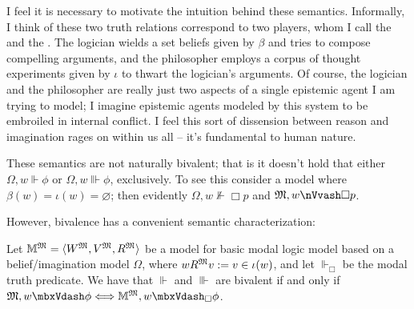 I feel it is necessary to motivate the intuition behind these semantics.  
Informally, I think of these two truth relations correspond to two players, whom I call the
{} and the {}.   The logician wields a set
beliefs given by $\beta$ and tries to compose compelling arguments, and the
philosopher employs a corpus of thought experiments given by $\iota$ to thwart
the logician's arguments.   Of course, the logician and the philosopher are
really just two aspects of a single epistemic agent I am trying to model; I
imagine epistemic agents modeled by this system to be embroiled in internal
conflict. I feel this sort of dissension between reason and imagination rages
on within us all -- it's fundamental to human nature.

These semantics are not naturally bivalent; that is it doesn't hold that
either $\Omega, w \Vdash \phi$ or $\Omega, w \Vvdash \phi$, exclusively. To
see this consider a model where $\beta (w) = \iota (w) = \varnothing$; then
evidently $\Omega, w {\nVdash} \Box p$ and $\Omega, w {\nVvdash} \Box p$.

However, bivalence has a convenient semantic characterization:

\begin{proposition}
  \label{biv1}Let $\mathbbm{M}^{\Omega} = \langle W^{\Omega}, V^{\Omega},
  R^{\Omega} \rangle$ be a model for basic modal logic model based on a
  belief/imagination model $\Omega$, where $w R^{\Omega} v \assign v \in \iota
  (w)$, and let $\Vdash_{\Box}$ be the modal truth predicate.   We have that
  $\Vdash$ and $\Vvdash$ are bivalent if and only if $\Omega, w \Vdash \phi
  \Longleftrightarrow \mathbbm{M}^{\Omega}, w \Vdash_{\Box} \phi$.
\end{proposition}

